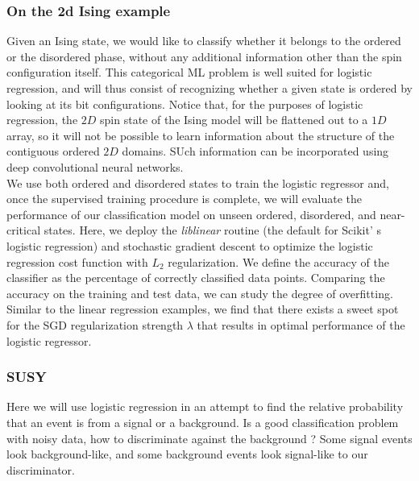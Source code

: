 \subsubsection{On the 2d Ising example}
Given an Ising state, we would like to classify whether it belongs to the ordered or the disordered phase, without any additional information other than the spin configuration itself. This categorical ML problem is well suited for logistic regression, and will thus consist of recognizing whether a given state is ordered by looking at its bit configurations. Notice that, for the purposes of logistic regression, the $2D$ spin state of the Ising model will be flattened out to a $1D$ array, so it will not be possible to learn information about the structure of the contiguous ordered $2D$ domains. SUch information can be incorporated using deep convolutional neural networks.\\
We use both ordered and disordered states to train the logistic regressor and, once the supervised training procedure is complete, we will evaluate the performance of our classification model on unseen ordered, disordered, and near-critical states. Here, we deploy the \emph{liblinear} routine (the default for Scikit' s logistic regression) and stochastic gradient descent to optimize the logistic regression cost function with $L_2$ regularization. We define the accuracy of the classifier as the percentage of correctly classified data points. Comparing the accuracy on the training and test data, we can study the degree of overfitting.\\
Similar to the linear regression examples, we find that there exists a sweet spot for the SGD regularization strength $\lambda$ that results in optimal performance of the logistic regressor.
\subsubsection{SUSY }
Here we will use logistic regression in an attempt to find the relative probability that an event is from a signal or a background. Is a good classification problem with noisy data, how to discriminate against the background ? Some signal events look background-like, and some background events look signal-like to our discriminator.
